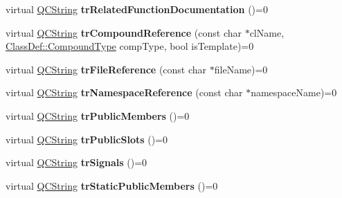\begin{DoxyCompactItemize}
\item 
\mbox{\label{class_translator_aec367f7f7b16943d6bb41572a728d064}} 
virtual \mbox{\hyperlink{class_q_c_string}{Q\+C\+String}} {\bfseries tr\+Related\+Function\+Documentation} ()=0
\item 
\mbox{\label{class_translator_a3d5b3f4d7fa46a79728673f3b6dfd661}} 
virtual \mbox{\hyperlink{class_q_c_string}{Q\+C\+String}} {\bfseries tr\+Compound\+Reference} (const char $\ast$cl\+Name, \mbox{\hyperlink{class_class_def_ae70cf86d35fe954a94c566fbcfc87939}{Class\+Def\+::\+Compound\+Type}} comp\+Type, bool is\+Template)=0
\item 
\mbox{\label{class_translator_a6f49523dd1d640f21a5cf6856b3654ac}} 
virtual \mbox{\hyperlink{class_q_c_string}{Q\+C\+String}} {\bfseries tr\+File\+Reference} (const char $\ast$file\+Name)=0
\item 
\mbox{\label{class_translator_a432360b0228e223d75384f797db6abec}} 
virtual \mbox{\hyperlink{class_q_c_string}{Q\+C\+String}} {\bfseries tr\+Namespace\+Reference} (const char $\ast$namespace\+Name)=0
\item 
\mbox{\label{class_translator_a4b4790665d064a1848772cf91ca8d022}} 
virtual \mbox{\hyperlink{class_q_c_string}{Q\+C\+String}} {\bfseries tr\+Public\+Members} ()=0
\item 
\mbox{\label{class_translator_a636e0e1cc32864447d2445935842a5ee}} 
virtual \mbox{\hyperlink{class_q_c_string}{Q\+C\+String}} {\bfseries tr\+Public\+Slots} ()=0
\item 
\mbox{\label{class_translator_a970ddc9df41ebdd40d97719faa7190d9}} 
virtual \mbox{\hyperlink{class_q_c_string}{Q\+C\+String}} {\bfseries tr\+Signals} ()=0
\item 
\mbox{\label{class_translator_ae7017c5aa5b5356a852c29fc6db86128}} 
virtual \mbox{\hyperlink{class_q_c_string}{Q\+C\+String}} {\bfseries tr\+Static\+Public\+Members} ()=0
\item 
\mbox{\label{class_translator_a46439037035e4dc2cec3de8477c90b73}} 

\end{DoxyCompactItemize}
